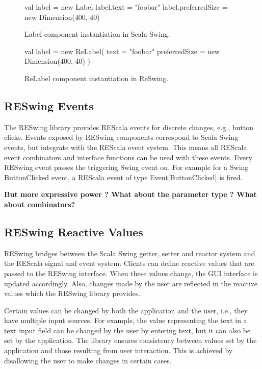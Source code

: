 \documentclass{scrartcl}
\newcommand{\code}[1]{{\fontfamily{cmtt}\small\selectfont#1}}
\begin{document}
\begin{figure}[htp]
\begin{codenv}
val label = new Label
label.text = "foobar"
label.preferredSize = new Dimension(400, 40)
\end{codenv}
\caption{Label component instantiation in Scala Swing.}
\label{lst:scala-swing-example}
\end{figure}

\begin{figure}[htp]
\begin{codenv}
val label = new ReLabel(
    text = "foobar"
    preferredSize = new Dimension(400, 40)
)
\end{codenv}
\caption{ReLabel component instantiation in ReSwing.}
\label{lst:reswing-example}
\end{figure}


\subsection{RESwing Events}
\label{sec:events}
The RESwing library provides REScala events for discrete changes,
e.g., button clicks. Events exposed by RESwing components correspond
to Scala Swing events, but integrate with the REScala event system.
This means all REScala event combinators and interface functions can
be used with these events. Every RESwing event passes the triggering
Swing event on. For example for a Swing \code{ButtonClicked} event, a
REScala event of type \code{Event[ButtonClicked]} is fired.

{\bf But more expressive power ? What about
  the parameter type ? What about combinators?}


\subsection{RESwing Reactive Values}
\label{sec:reactive-values}


RESwing bridges between the Scala Swing getter, setter and reactor
system and the REScala signal and event system. Clients can define
reactive values that are passed to the RESwing interface. When these
values change, the GUI interface is updated accordingly. Also, changes
made by the user are reflected in the reactive values which the
RESwing library provides.

Certain values can be changed by both the application and the user,
i.e., they have multiple input sources. For example, the value
representing the text in a text input field can be changed by the
user by entering text, but it can also be set by the application.
The library ensures consistency between values set by the application
and those resulting from user interaction. This is achieved by
disallowing the user to make changes in certain cases.
\end{document}
